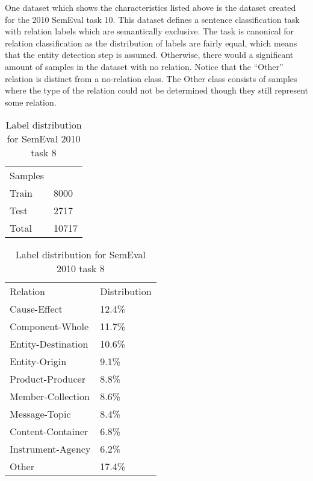 One dataset which shows the characteristics listed above is the dataset created for the 2010 SemEval task 10\cite{semeval2010}. This dataset defines a sentence classification task with relation labels which are semantically exclusive. The task is canonical for relation classification as the distribution of labels are fairly equal, which means that the entity detection step is assumed. Otherwise, there would a significant amount of samples in the dataset with no relation. Notice that the ``Other'' relation is distinct from a no-relation class. The Other class consists of samples where the type of the relation could not be determined though they still represent some relation.   

\begin{table}
\parbox{.45\linewidth}{
\centering
\caption{Train-test distribution for SemEval 2010 task 8}
\label{my-label}
\begin{tabular}{ll}
Samples &       \\
Train   & 8000  \\
Test    & 2717  \\
Total   & 10717
\end{tabular}
}
\hfill
\parbox{.45\linewidth}{
\centering
\caption{Label distribution for SemEval 2010 task 8}
\label{my-label}
\begin{tabular}{ll}
Relation           & Distribution \\
Cause-Effect       & 12.4\%       \\
Component-Whole    & 11.7\%       \\
Entity-Destination & 10.6\%       \\
Entity-Origin      & 9.1\%        \\
Product-Producer   & 8.8\%        \\
Member-Collection  & 8.6\%        \\
Message-Topic      & 8.4\%        \\
Content-Container  & 6.8\%        \\
Instrument-Agency  & 6.2\%        \\
Other              & 17.4\%      
\end{tabular}
}
\end{table}

